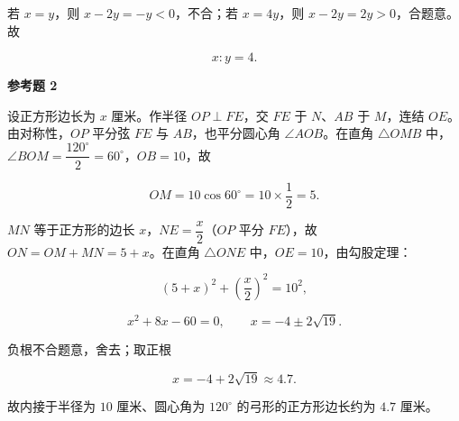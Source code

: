 \begin{answer}
若 $x=y$，则 $x-2y=-y<0$，不合；若 $x=4y$，则 $x-2y=2y>0$，合题意。故

\nopagebreak[4]
\[
x:y=4.
\]

\textbf{参考题 2}
\nopagebreak[4]
\begin{center}\end{center}
\nopagebreak[4]
设正方形边长为 $x$ 厘米。作半径 $OP\perp FE$，交 $FE$ 于 $N$、$AB$ 于 $M$，连结 $OE$。由对称性，$OP$ 平分弦 $FE$ 与 $AB$，也平分圆心角 $\angle AOB$。在直角 $\triangle OMB$ 中，$\angle BOM=\dfrac{120^\circ}{2}=60^\circ$，$OB=10$，故

\nopagebreak[4]
\[
OM=10\cos60^\circ=10\times\frac12=5.
\]

$MN$ 等于正方形的边长 $x$，$NE=\dfrac x2$（$OP$ 平分 $FE$），故 $ON=OM+MN=5+x$。在直角 $\triangle ONE$ 中，$OE=10$，由勾股定理：

\nopagebreak[4]
\[
(5+x)^2+\left(\frac x2\right)^2=10^2,
\]

\nopagebreak[4]
\[
x^2+8x-60=0,
\qquad
x=-4\pm2\sqrt{19}.
\]

负根不合题意，舍去；取正根

\nopagebreak[4]
\[
x=-4+2\sqrt{19}\approx4.7.
\]

故内接于半径为 $10$ 厘米、圆心角为 $120^\circ$ 的弓形的正方形边长约为 $4.7$ 厘米。


\end{answer}